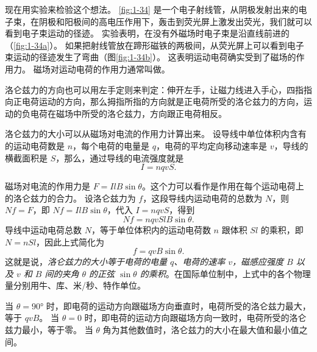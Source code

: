 现在用实验来检验这个想法。
\cref{fig:1-34} 是一个电子射线管，从阴极发射出来的电子束，在阴极和阳极间的高电压作用下，轰击到荧光屏上激发出荧光，我们就可以看到电子束运动的径迹。
实验表明，在没有外磁场时电子束是沿直线前进的（\cref{fig:1-34a}）。
如果把射线管放在蹄形磁铁的两极间，从荧光屏上可以看到电子束运动的径迹发生了弯曲（图\cref{fig:1-34b}）。 
这表明运动电荷确实受到了磁场的作用力。
磁场对运动电荷的作用力通常叫做。

洛仑兹力的方向也可以用左手定则来判定：伸开左手，让磁力线进入手心，四指指向正电荷运动的方向，那么拇指所指的方向就是正电荷所受的洛仑兹力的方向，运动的负电荷在磁场中所受的洛仑兹力，方向跟正电荷相反。

洛仑兹力的大小可以从磁场对电流的作用力计算出来。
设导线中单位体积内含有的运动电荷数是 $n$，每个电荷的电量是 $q$，电荷的平均定向移动速率是 $v$，导线的横截面积是 $S$，那么，通过导线的电流强度就是
\[I=nqvS.\]

磁场对电流的作用力是 $F=Il B\sin\theta$。这个力可以看作是作用在每个运动电荷上的洛仑兹力的合力。
设洛仑兹力为 $f$，这段导线内运动电荷的总数为 $N$，则 $Nf=F$，即 $Nf=Il B\sin\theta$，代入 $I=nqvS$，得到
\[Nf=nqvSl B\sin\theta.\]
导线中运动电荷总数 $N$，等于单位体积内的运动电荷数 $n$ 跟体积 $Sl$ 的乘积，即$N=nSl$，因此上式简化为
\[f=qvB\sin\theta.\]
这就是说，\emph{洛仑兹力的大小等于电荷的电量 $q$、电荷的速率 $v$，磁感应强度 $B$ 以及 $v$ 和 $B$ 间的夹角 $\theta$ 的正弦 $\sin\theta$ 的乘积}。在国际单位制中，上式中的各个物理量分别用牛、库、米/秒、特作单位。

当 $\theta=\ang{90}$ 时，即电荷的运动方向跟磁场方向垂直时，电荷所受的洛仑兹力最大，等于 $qvB$。
当 $\theta=0$ 时，即电荷的运动方向跟磁场方向一致时，电荷所受的洛仑兹力最小，等于零。
当 $\theta$ 角为其他数值时，洛仑兹力的大小在最大值和最小值之间。

